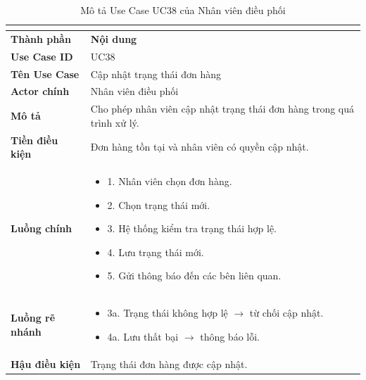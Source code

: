 \begin{longtable}{|C{3cm}|L{11cm}|}
\caption{Mô tả Use Case UC38 của Nhân viên điều phối}\\
\label{tab:mo-ta-uc38-dieu-phoi}\\
\hline
\textbf{Thành phần} & \textbf{Nội dung} \\
\hline
\textbf{Use Case ID} & UC38 \\
\hline
\textbf{Tên Use Case} & Cập nhật trạng thái đơn hàng \\
\hline
\textbf{Actor chính} & Nhân viên điều phối \\
\hline
\textbf{Mô tả} &
Cho phép nhân viên cập nhật trạng thái đơn hàng trong quá trình xử lý. \\
\hline
\textbf{Tiền điều kiện} &
Đơn hàng tồn tại và nhân viên có quyền cập nhật. \\
\hline
\textbf{Luồng chính} &
\begin{itemize}[leftmargin=*,topsep=2pt,itemsep=2pt]
    \item 1. Nhân viên chọn đơn hàng.
    \item 2. Chọn trạng thái mới.
    \item 3. Hệ thống kiểm tra trạng thái hợp lệ.
    \item 4. Lưu trạng thái mới.
    \item 5. Gửi thông báo đến các bên liên quan.
\end{itemize} \\
\hline
\textbf{Luồng rẽ nhánh} &
\begin{itemize}[leftmargin=*,topsep=2pt,itemsep=2pt]
    \item 3a. Trạng thái không hợp lệ $\rightarrow$ từ chối cập nhật.
    \item 4a. Lưu thất bại $\rightarrow$ thông báo lỗi.
\end{itemize} \\
\hline
\textbf{Hậu điều kiện} &
Trạng thái đơn hàng được cập nhật. \\
\hline
\end{longtable}


